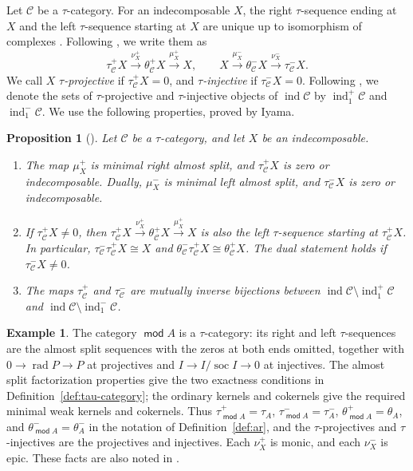\documentclass[a4paper,reqno,10pt]{amsart}
\newtheorem{proposition}[theorem]{Proposition}
\theoremstyle{definition}
\newtheorem{example}[theorem]{Example}
\numberwithin{equation}{section}
\DeclareMathOperator{\moduleCategory}{\mathsf{mod}}
\renewcommand{\mod}{\moduleCategory}
\DeclareMathOperator{\ind}{ind}
\DeclareMathOperator{\rad}{rad}
\DeclareMathOperator{\soc}{soc}
\newcommand{\cC}{\mathcal C}
\begin{document}
Let \(\cC\) be a \(\tau\)-category. For an indecomposable \(X\), the right
\(\tau\)-sequence ending at \(X\) and the left \(\tau\)-sequence starting
at \(X\) are unique up to isomorphism of complexes
\cite[Section~2.1]{IyamaI}. Following
\cite[Section~1.3]{IyamaIV}, we write them as
\[
 \tau_{\cC}^+X\xrightarrow{\nu_X^+}\theta_{\cC}^+X\xrightarrow{\mu_X^+}X,
 \qquad
 X\xrightarrow{\mu_X^-}\theta_{\cC}^-X\xrightarrow{\nu_X^-}\tau_{\cC}^-X.
\]
We call \(X\) \emph{\(\tau\)-projective} if \(\tau_{\cC}^+X=0\), and
\emph{\(\tau\)-injective} if \(\tau_{\cC}^-X=0\). Following
\cite[Section~2.1(3)]{IyamaI}, we denote the sets of \(\tau\)-projective
and \(\tau\)-injective objects of \(\ind\cC\) by \(\ind_1^+\cC\) and
\(\ind_1^-\cC\). We use the following properties, proved by Iyama.
\begin{proposition}[{\cite[Sections~2.1 and~2.3]{IyamaI}}]\label{rem:tau-properties}
Let \(\cC\) be a \(\tau\)-category, and let \(X\) be an indecomposable.
\begin{enumerate}
\item The map \(\mu_X^+\) is minimal right almost split, and
\(\tau_{\cC}^+X\) is zero or indecomposable. Dually, \(\mu_X^-\) is
minimal left almost split, and \(\tau_{\cC}^-X\) is zero or
indecomposable.
\item If \(\tau_{\cC}^+X\ne0\), then
\(\tau_{\cC}^+X\xrightarrow{\nu_X^+}\theta_{\cC}^+X\xrightarrow{\mu_X^+}X\)
is also the left \(\tau\)-sequence starting at \(\tau_{\cC}^+X\). In
particular, \(\tau_{\cC}^-\tau_{\cC}^+X\cong X\) and
\(\theta_{\cC}^-\tau_{\cC}^+X\cong\theta_{\cC}^+X\). The dual statement
holds if \(\tau_{\cC}^-X\ne0\).
\item The maps \(\tau_{\cC}^+\) and \(\tau_{\cC}^-\) are mutually inverse
bijections between \(\ind\cC\setminus\ind_1^+\cC\) and
\(\ind\cC\setminus\ind_1^-\cC\).
\end{enumerate}
\end{proposition}
\begin{example}\label{ex:module-tau}
The category \(\mod A\) is a \(\tau\)-category: its right and left
\(\tau\)-sequences are the
almost split sequences with the zeros at both ends omitted, together with
\(0\to\rad P\to P\) at projectives and
\(I\to I/\soc I\to0\) at injectives.
The almost split factorization properties give the two exactness
conditions in Definition~\ref{def:tau-category}; the ordinary kernels and cokernels
give the required minimal weak kernels and cokernels. Thus
\(\tau_{\mod A}^+=\tau_A\), \(\tau_{\mod A}^-=\tau_A^-\),
\(\theta_{\mod A}^+=\theta_A\), and \(\theta_{\mod A}^-=\theta_A^-\)
in the notation of Definition~\ref{def:ar}, and the \(\tau\)-projectives
and \(\tau\)-injectives are the projectives and injectives. Each
\(\nu_X^+\) is monic, and each \(\nu_X^-\) is epic. These facts are also noted in
\cite[Section~1.3]{IyamaIV}.
\end{example}
\end{document}
